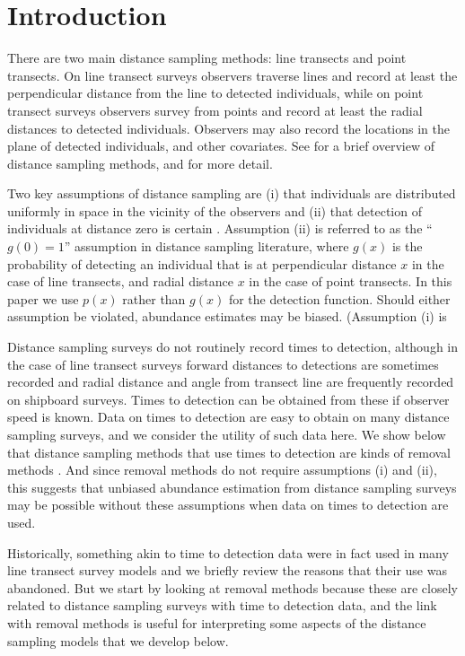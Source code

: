 \documentclass[useAMS,usenatbib,referee]{biom}
\begin{document}
\section{Introduction\label{intro}}

There are two main distance sampling methods: line transects and point transects. On line transect surveys observers traverse lines and record at least the perpendicular distance from the line to detected individuals, while on point transect surveys observers survey from points and record at least the radial distances to detected individuals. Observers may also record the locations in the plane of detected individuals, and other covariates. See \cite{Marques+al:10} for a brief overview of distance sampling methods, and \cite{Buckland+al:01} for more detail.

Two key assumptions of distance sampling are (i) that individuals are distributed uniformly in space in the vicinity of the observers and (ii) that detection of individuals at distance zero is certain \citep{Buckland+al:01}. Assumption (ii) is referred to as the ``$g(0)=1$'' assumption in distance sampling literature, where $g(x)$ is the probability of detecting an individual that is at perpendicular distance $x$ in the case of line transects, and radial distance $x$ in the case of point transects. In this paper we use $p(x)$ rather than $g(x)$ for the detection function. Should either assumption be violated, abundance estimates may be biased. (Assumption (i) is 

Distance sampling surveys do not routinely record times to detection, although in the case of line transect surveys forward distances to detections are sometimes recorded and radial distance and angle from transect line are frequently recorded on shipboard surveys. Times to detection can be obtained from these if observer speed is known. Data on times to detection are easy to obtain on many distance sampling surveys, and we consider the utility of such data here. We show below that distance sampling methods that use times to detection are kinds of removal methods \citep[see][, Chapters 7 and 5, respectively, for an overview of removal methods]{Seber:82, Borchers+al:02}. And since removal methods do not require assumptions (i) and (ii), this suggests that unbiased abundance estimation from distance sampling surveys may be possible without these assumptions when data on times to detection are used. 

Historically, something akin to time to detection data were in fact used in many line transect survey models and we briefly review the reasons that their use was abandoned. But we start by looking at removal methods because these are closely related to distance sampling surveys with time to detection data, and the link with removal methods is useful for interpreting some aspects of the distance sampling models that we develop below.
\end{document}
